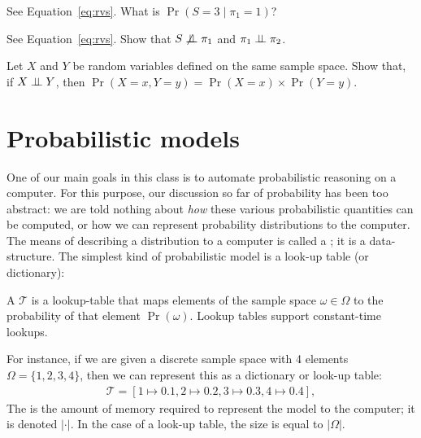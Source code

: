 \documentclass{tufte-handout}
\begin{document}
\begin{exercise}[$\star$]
    See Equation~\ref{eq:rvs}.  What is $\Pr(S = 3 \mid \pi_1 = 1)$?
\end{exercise}

\begin{exercise}[$\star$]
    See Equation~\ref{eq:rvs}. Show that $S \not \perp \!\!\! \perp \pi_1$ and $\pi_1 \perp \!\!\! \perp \pi_2$. 
\end{exercise}

\begin{exercise}[$\star$]
    Let $X$ and $Y$ be random variables defined on the same sample space. Show 
    that, if $X \perp \!\!\! \perp Y$, then $\Pr(X = x, Y = y) = \Pr(X = x) \times \Pr(Y = y)$.
\end{exercise}

\section{Probabilistic models}
One of our main goals in this class is to automate probabilistic reasoning on a
computer.  For this purpose, our discussion so far of probability has been too
abstract: we are told nothing about \emph{how} these various probabilistic
quantities can be computed, or how we can represent probability distributions to
the computer. The means of describing a distribution to a computer is called a
; it is a data-structure. The simplest kind of
probabilistic model is a look-up table (or dictionary):
\begin{definition}
    A  $\mathcal{T}$ is a lookup-table that maps
    elements of the sample space $\omega \in \Omega$ to the probability of that
    element $\Pr(\omega)$. 
    Lookup tables support constant-time lookups.
\end{definition}

For instance, if we are given a discrete sample space with 4 
elements $\Omega = \{1, 2, 3, 4\}$, then we can represent this as 
a dictionary or look-up table:
\begin{align}
    \mathcal{T} = [1 \mapsto 0.1, 2 \mapsto 0.2, 3 \mapsto 0.3, 4 \mapsto 0.4],
\end{align}
The  is the amount of memory required to represent the model to the 
computer; it is denoted $|\cdot|$. In the case of a look-up table, the size is 
equal to $|\Omega|$.
\end{document}

